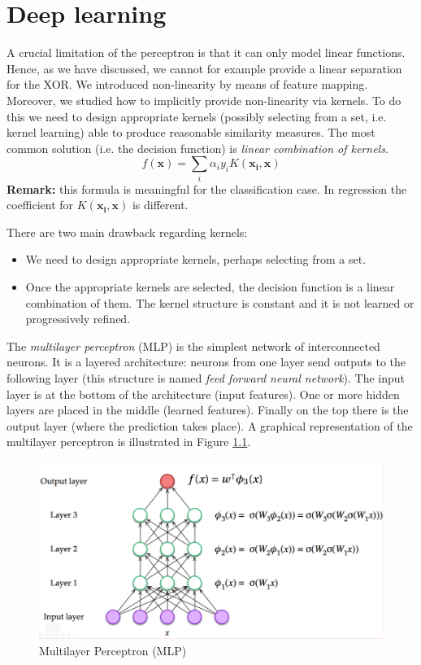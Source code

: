 \chapter{Deep learning}
\label{cha:deep_learning} A crucial limitation of the perceptron is that it can only
model linear functions. Hence, as we have discussed, we cannot for example
provide a linear separation for the XOR. We introduced non-linearity by means of
feature mapping. Moreover, we studied how to implicitly provide non-linearity via
kernels. To do this we need to design appropriate kernels (possibly selecting from
a set, i.e. kernel learning) able to produce reasonable similarity measures. The
most common solution (i.e. the decision function) is \textit{linear combination
of kernels}.
\[
	f(\pmb{x}) = \sum_{i}\alpha_{i}y_{i}K(\pmb{x_i}, \pmb{x})
\]
\textbf{Remark:} this formula is meaningful for the classification case. In
regression the coefficient for $K(\pmb{x_i}, \pmb{x})$ is different.
\newline

There are two main drawback regarding kernels:
\begin{itemize}
	\item We need to design appropriate kernels, perhaps selecting from a set.

	\item Once the appropriate kernels are selected, the decision function is a
		linear combination of them. The kernel structure is constant and it is not learned
		or progressively refined.
\end{itemize}

The \textit{multilayer perceptron} (MLP) is the simplest network of interconnected
neurons. It is a layered architecture: neurons from one layer send outputs to the
following layer (this structure is named \textit{feed forward neural network}). The
input layer is at the bottom of the architecture (input features). One or more
hidden layers are placed in the middle (learned features). Finally on the top there
is the output layer (where the prediction takes place). A graphical
representation of the multilayer perceptron is illustrated in Figure
\ref{fig:mlp}.
\newline

\begin{figure}[H]
	\centering
	\includegraphics[width=\textwidth]{
		images/16_DeepLearning_multilayerPerceptron.png
	}
	\caption{Multilayer Perceptron (MLP)}
	\label{fig:mlp}
\end{figure}

